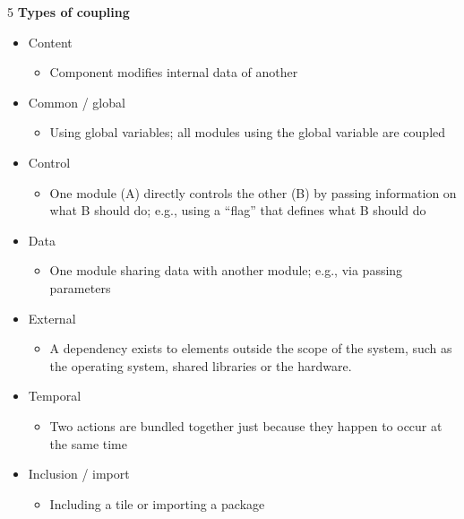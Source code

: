 \documentclass[landscape,a4paper]{extarticle}
\begin{document}
\begin{multicols*}{5}
    \textbf{Types of coupling}
    \begin{itemize}
        \item Content
        \begin{itemize}
            \item Component modifies internal data of another
        \end{itemize}
        \item Common / global
        \begin{itemize}
            \item Using global variables; all modules using the global variable are coupled
        \end{itemize}
        \item Control
        \begin{itemize}
            \item One module (A) directly controls the other (B) by passing information on what B should do; e.g., using a ``flag'' that defines what B should do
        \end{itemize}
        \item Data
        \begin{itemize}
            \item One module sharing data with another module; e.g., via passing parameters
        \end{itemize}
        \item External
        \begin{itemize}
            \item A dependency exists to elements outside the scope of the system, such as the operating system, shared libraries or the hardware.
        \end{itemize}
        \item Temporal
        \begin{itemize}
            \item Two actions are bundled together just because they happen to occur at the same time
        \end{itemize}
        \item Inclusion / import
        \begin{itemize}
            \item Including a tile or importing a package
        \end{itemize}
    \end{itemize}


\end{multicols*}
\end{document}
